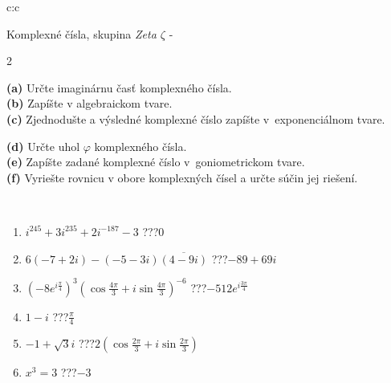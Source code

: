 \documentclass[10pt]{report}
\begin{document}
\begin{tabular}{c:c}
\begin{minipage}[c][104.5mm][t]{0.5\linewidth}
\begin{center}
\vspace{7mm}
{\huge Komplexné čísla, skupina \textit{Zeta $\zeta$} -}\\[5mm]
\begin{minipage}{0.95\linewidth}
\begin{center}
{\small \begin{multicols}{2} \raggedright
\textbf{(a)} Určte imaginárnu časť komplexného čísla. \\[1mm]
\textbf{(b)} Zapíšte v algebraickom tvare. \\[1mm]
\textbf{(c)} Zjednodušte a výsledné komplexné číslo zapíšte v~exponenciálnom tvare. \par \columnbreak
\textbf{(d)} Určte uhol \(\varphi\) komplexného čísla. \\[1mm]
\textbf{(e)} Zapíšte zadané komplexné číslo v~goniometrickom tvare. \\[1mm]
\textbf{(f)} Vyriešte rovnicu v obore komplexných čísel a určte súčin jej riešení.
\end{multicols}
}
\end{center}
\end{minipage}
\\[4mm]
\begin{minipage}{0.79\linewidth}
\begin{center}
\begin{varwidth}{\linewidth}
\begin{enumerate}
\large
\item $i^{245}+3i^{235}+2i^{-187}-3$\quad \dotfill\; ???\;\dotfill \quad $0$
\item $6(-7+2i)-(-5-3i)\overline{(4-9i)}$\quad \dotfill\; ???\;\dotfill \quad $-89+69i$
\item $\left(-8e^{i\frac{\pi}{4}}\right)^{3}\left(\cos{\frac{4\pi}{3}}+i\sin{\frac{4\pi}{3}}\right)^{-6}$\quad \dotfill\; ???\;\dotfill \quad $-512e^{i\frac{3\pi}{4}}$
\item $1-i$\quad \dotfill\; ???\;\dotfill \quad $\frac{\pi}{4}$
\item $-1+\sqrt{3}i$\quad \dotfill\; ???\;\dotfill \quad $2\left(\cos{\frac{2\pi}{3}}+i\sin{\frac{2\pi}{3}}\right)$
\item $x^3=3$\quad \dotfill\; ???\;\dotfill \quad $-3$
\end{enumerate}
\end{varwidth}

\end{center}
\end{minipage}
\end{center}
\end{minipage}
\end{tabular}
\end{document}
